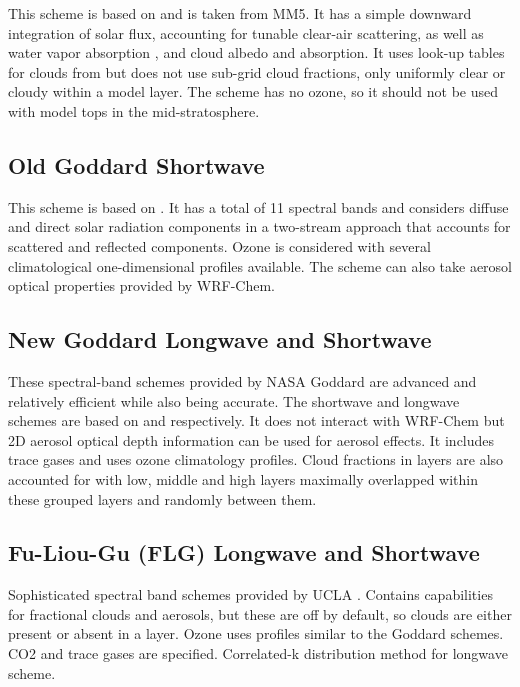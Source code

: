 This scheme is based on \citet{dudhia89} and is taken from MM5. It has a simple 
downward integration of solar flux, accounting for tunable clear-air scattering, as well as 
water vapor absorption \citep{lacis74}, and cloud albedo and absorption. 
It uses look-up tables for clouds from \citet{stephens78} but does not use
sub-grid cloud fractions, only uniformly clear or cloudy within a model layer. The scheme
has no ozone, so it should not be used with model tops in the mid-stratosphere.

\subsection {Old Goddard Shortwave}

This scheme is based on \citet{chou94}. It has a total of 11 spectral 
bands and considers diffuse and direct solar radiation components in a two-stream 
approach that accounts for scattered and reflected components. Ozone is considered 
with several climatological one-dimensional profiles available. The scheme can also take
aerosol optical properties provided by WRF-Chem.

\subsection {New Goddard Longwave and Shortwave}

These spectral-band schemes provided by NASA Goddard are advanced and relatively efficient while also being accurate.
The shortwave and longwave schemes are based on \citet{chou99} and \citet{chou01}
respectively. It does not interact with WRF-Chem but 2D aerosol optical depth
information can be used for aerosol effects. It includes trace gases and uses
ozone climatology profiles. Cloud fractions in layers are also accounted for with
low, middle and high layers maximally overlapped within these grouped layers and randomly between
them.

\subsection {Fu-Liou-Gu (FLG) Longwave and Shortwave}

Sophisticated spectral band schemes provided by UCLA  \citep{gu11,fu92}.
Contains capabilities for fractional clouds and aerosols, but these are off by default,
so clouds are either present or absent in a layer. Ozone uses profiles similar to the
Goddard schemes. CO2 and trace gases are specified.
Correlated-k distribution method for longwave scheme.

